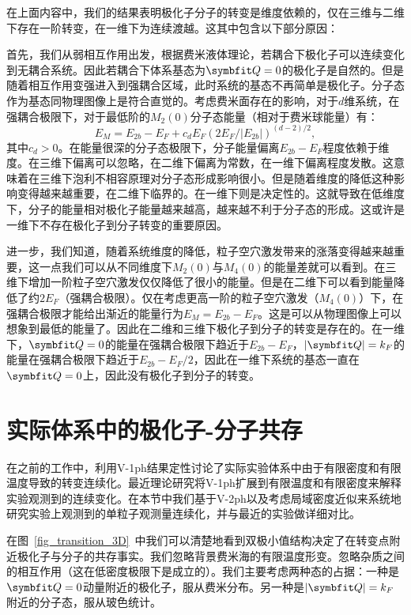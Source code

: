 在上面内容中，我们的结果表明极化子分子的转变是维度依赖的，仅在三维与二维下存在一阶转变，在一维下为连续渡越。这其中包含以下部分原因：

首先，我们从弱相互作用出发，根据费米液体理论，若耦合下极化子可以连续变化到无耦合系统。因此若耦合下体系基态为$\Vector{Q}=0$的极化子是自然的。但是随着相互作用变强进入到强耦合区域，此时系统的基态不再简单是极化子。分子态作为基态同物理图像上是符合直觉的。考虑费米面存在的影响，对于$d$维系统，在强耦合极限下，对于最低阶的$M_2(0)$分子态能量（相对于费米球能量）有\cite{Zollner2011Polarons}：
\begin{equation}
E_M=E_{2b}-E_F+c_d E_F(2E_F/|E_{2b}|)^{(d-2)/2},
\end{equation}
其中$c_d>0$。在能量很深的分子态极限下，分子能量偏离$E_{2b}-E_F$程度依赖于维度。在三维下偏离可以忽略，在二维下偏离为常数，在一维下偏离程度发散。这意味着在三维下泡利不相容原理对分子态形成影响很小。但是随着维度的降低这种影响变得越来越重要，在二维下临界的。在一维下则是决定性的。这就导致在低维度下，分子的能量相对极化子能量越来越高，越来越不利于分子态的形成。这或许是一维下不存在极化子到分子转变的重要原因。

进一步，我们知道，随着系统维度的降低，粒子空穴激发带来的涨落变得越来越重要，这一点我们可以从不同维度下$M_2(0)$与$M_4(0)$的能量差就可以看到。在三维下增加一阶粒子空穴激发仅仅降低了很小的能量。但是在二维下可以看到能量降低了约$2E_F$（强耦合极限）。仅在考虑更高一阶的粒子空穴激发（$M_4(0)$）下，在强耦合极限才能给出渐近的能量行为$E_M=E_{2b}-E_F$。这是可以从物理图像上可以想象到最低的能量了。因此在二维和三维下极化子到分子的转变是存在的。在一维下，$\Vector{Q}=0$的能量在强耦合极限下趋近于$E_{2b}-E_F$，$|\Vector{Q}|=k_F$的能量在强耦合极限下趋近于$E_{2b}-E_F/2$，因此在一维下系统的基态一直在$\Vector{Q}=0$上，因此没有极化子到分子的转变。

\section{实际体系中的极化子-分子共存}\label{3sec:LDA}
在之前的工作中\cite{Cui2020Fermi}，利用V-1ph结果定性讨论了实际实验体系中由于有限密度和有限温度导致的转变连续化。最近理论研究\cite{Parish2021thermodynamic}将V-1ph扩展到有限温度和有限密度来解释实验观测到的连续变化。在本节中我们基于V-2ph以及考虑局域密度近似来系统地研究实验上观测到的单粒子观测量连续化，并与最近的实验做详细对比\cite{Sagi2020}。

在图~\ref{fig_transition_3D}~中我们可以清楚地看到双极小值结构决定了在转变点附近极化子与分子的共存事实。我们忽略背景费米海的有限温度形变。忽略杂质之间的相互作用（这在低密度极限下是成立的）。我们主要考虑两种态的占据：一种是$\Vector{Q}=0$动量附近的极化子，服从费米分布。另一种是$|\Vector{Q}|=k_F$附近的分子态，服从玻色统计。


